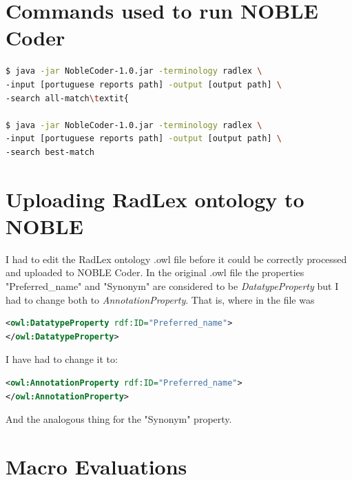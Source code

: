 \label{appendices}

\renewcommand{\thechapter}{A}
\chapter{Commands used to run NOBLE Coder}
\label{app:commands_run_noble}

\begin{lstlisting}[language=bash]
$ java -jar NobleCoder-1.0.jar -terminology radlex \
-input [portuguese reports path] -output [output path] \
-search all-match\textit{

$ java -jar NobleCoder-1.0.jar -terminology radlex \
-input [portuguese reports path] -output [output path] \
-search best-match
\end{lstlisting}

\chapter{Uploading RadLex ontology to NOBLE}
\label{app:change_radlex_noble}

I had to edit the RadLex ontology .owl file before it could be correctly processed and uploaded to NOBLE Coder. In the original .owl file the properties  "Preferred\_name" and "Synonym" are considered to be \textit{DatatypeProperty} but I had to change both to \textit{AnnotationProperty}. That is, where in the file was

\begin{lstlisting}[language=xml]
<owl:DatatypeProperty rdf:ID="Preferred_name">
</owl:DatatypeProperty>
\end{lstlisting}

I have had to change it to:

\begin{lstlisting}[language=xml]
<owl:AnnotationProperty rdf:ID="Preferred_name">
</owl:AnnotationProperty>
\end{lstlisting}

And the analogous thing for the "Synonym" property.


\chapter{Macro Evaluations}
\label{app:macro_evaluations}

